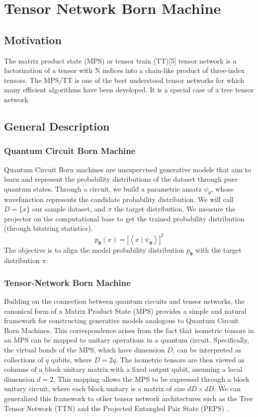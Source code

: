 \chapter{Tensor Network Born Machine}
\section{Motivation}
The matrix product state (MPS) \cite{} or tensor train (TT)[5] tensor network is a factorization of a tensor with N indices into a chain-like product of three-index tensors. The MPS/TT is one of the best understood tensor networks for which many efficient algorithms have been developed. It is a special case of a tree tensor network.

\section{General Description}
\subsection{Quantum Circuit Born Machine}
Quantum Circuit Born machines are unsupervised generative models that aim to learn and represent the probability distributions of the dataset through pure quantum states. Through a circuit, we build a parametric ansatz $\psi_{\theta}$, whose wavefunction represents the candidate probability distribution. We will call $D = \{x\}$ our sample dataset, and $\pi$ the target distribution. We measure the projector on the computational base to get the trained probability distribution (through bitstring statistics).
\[ p_{\boldsymbol{\theta}}(x)=\left|\left\langle x \mid \psi_{\boldsymbol{\theta}}\right\rangle\right|^2\]
The objective is to align the model probability distribution $p_{\boldsymbol{\theta}}$ with the target distribution $\pi$.

\subsection{Tensor-Network Born Machine}
Building on the connection between quantum circuits and tensor networks, the canonical form of a Matrix Product State (MPS) provides a simple and natural framework for constructing generative models analogous to Quantum Circuit Born Machines. This correspondence arises from the fact that isometric tensors in an MPS can be mapped to unitary operations in a quantum circuit. Specifically, the virtual bonds of the MPS, which have dimension $D$, can be interpreted as collections of $q$ qubits, where $D=2q$. The isometric tensors are then viewed as columns of a block unitary matrix with a fixed output qubit, assuming a local dimension $d=2$. This mapping allows the MPS to be expressed through a block unitary circuit, where each block unitary is a matrix of size $dD\times dD$. We can generalized this framework to other tensor network architectures such as the Tree Tensor Network (TTN) and the Projected Entangled Pair State (PEPS) \cite{haghshenas_variational_2022}. \\

